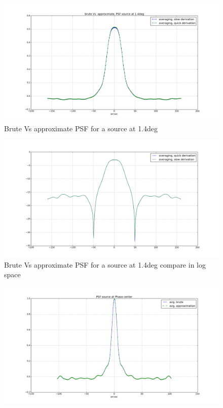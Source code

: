 \begin{figure}
\includegraphics[width=1\textwidth]{./Figures/averaging_brute_quick_good.png}\caption{Brute Vs approximate PSF for a source at 1.4deg}\label{fig:uvcov}
 \end{figure}
 \begin{figure}
\includegraphics[width=1\textwidth]{./Figures/averaging_brute_quick_logscale.png}\caption{Brute Vs approximate PSF for a source at 1.4deg compare in log space}\label{fig:corrSigVLAMxBl_overlapGdelta}
\end{figure}
 \begin{figure}
\includegraphics[width=1\textwidth]{./Figures/phasecentre.png}
\end{figure}

% 
